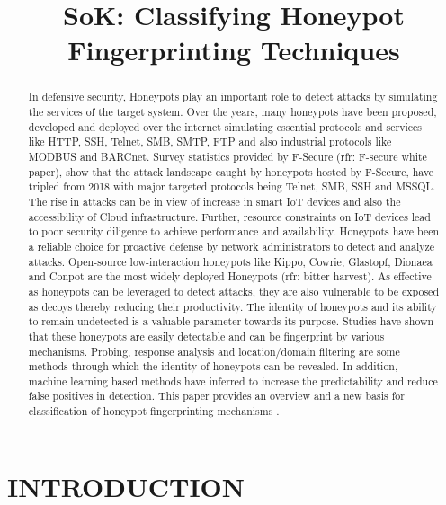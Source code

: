 \documentclass[letterpaper, 10 pt, conference]{ieeeconf}  %
\title{\LARGE \bf
SoK: Classifying Honeypot Fingerprinting Techniques
}
\begin{document}
\maketitle
\thispagestyle{empty}
\pagestyle{empty}


\begin{abstract}
In defensive security, Honeypots play an important role to detect attacks by simulating the services of the target system. Over the years, many honeypots have been proposed, developed and deployed over the internet simulating essential protocols and services like HTTP, SSH, Telnet, SMB, SMTP, FTP and also industrial protocols like MODBUS and BARCnet. Survey statistics provided by F-Secure (rfr: F-secure white paper), show that the attack landscape caught by honeypots hosted by F-Secure, have tripled from 2018 with major targeted protocols being Telnet, SMB, SSH and  MSSQL. The rise in attacks can be in view of increase in smart IoT devices and also the accessibility of Cloud infrastructure. Further, resource constraints on IoT devices lead to poor security diligence to achieve performance and availability. Honeypots have been a reliable choice for proactive defense by  network administrators to detect and analyze attacks. Open-source low-interaction honeypots like Kippo, Cowrie, Glastopf, Dionaea and Conpot are the most widely deployed Honeypots (rfr: bitter harvest). As effective as  honeypots can be leveraged to detect attacks, they are also vulnerable to be exposed as decoys thereby reducing their productivity. The identity of honeypots and its ability to remain undetected is a valuable parameter towards its purpose. Studies have shown that these honeypots are easily detectable and can be fingerprint by various mechanisms. Probing, response analysis and  location/domain filtering are some methods through which the identity of honeypots can be revealed. In addition, machine learning based methods have inferred to increase the predictability and reduce false positives in detection. This paper provides an overview and a new basis for classification of honeypot fingerprinting mechanisms . 
\end{abstract}


\section{INTRODUCTION}
\end{document}
